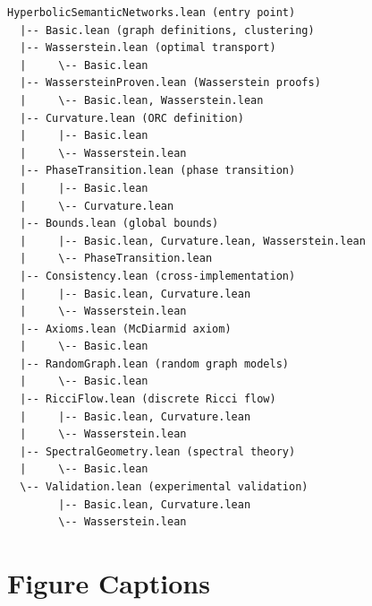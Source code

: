 \documentclass[12pt]{article}
\begin{document}
\begin{verbatim}
HyperbolicSemanticNetworks.lean (entry point)
  |-- Basic.lean (graph definitions, clustering)
  |-- Wasserstein.lean (optimal transport)
  |     \-- Basic.lean
  |-- WassersteinProven.lean (Wasserstein proofs)
  |     \-- Basic.lean, Wasserstein.lean
  |-- Curvature.lean (ORC definition)
  |     |-- Basic.lean
  |     \-- Wasserstein.lean
  |-- PhaseTransition.lean (phase transition)
  |     |-- Basic.lean
  |     \-- Curvature.lean
  |-- Bounds.lean (global bounds)
  |     |-- Basic.lean, Curvature.lean, Wasserstein.lean
  |     \-- PhaseTransition.lean
  |-- Consistency.lean (cross-implementation)
  |     |-- Basic.lean, Curvature.lean
  |     \-- Wasserstein.lean
  |-- Axioms.lean (McDiarmid axiom)
  |     \-- Basic.lean
  |-- RandomGraph.lean (random graph models)
  |     \-- Basic.lean
  |-- RicciFlow.lean (discrete Ricci flow)
  |     |-- Basic.lean, Curvature.lean
  |     \-- Wasserstein.lean
  |-- SpectralGeometry.lean (spectral theory)
  |     \-- Basic.lean
  \-- Validation.lean (experimental validation)
        |-- Basic.lean, Curvature.lean
        \-- Wasserstein.lean
\end{verbatim}

\section{Figure Captions}
\label{app:D}
\end{document}
